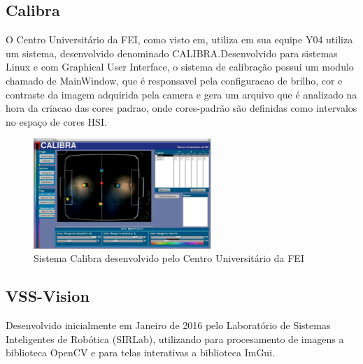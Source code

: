 \subsection{Calibra}
O Centro Universitário da FEI, como visto em\cite{PenharbelTime}, utiliza em sua equipe Y04 utiliza um sistema, desenvolvido denominado CALIBRA\cite{Penharbel:2004}.Desenvolvido para sistemas Linux e com Graphical User Interface\cite{Penharbel:2004}, o sistema de calibração possui um modulo chamado de MainWindow, que é responsavel pela configuracao de brilho, cor e contraste da imagem adquirida pela camera e gera um arquivo que é analizado na hora da criacao das cores padrao\cite{PenharbelTime}, onde cores-padrão são definidas como intervalos no espaço de cores HSI\cite{PenharbelTime}.

\begin{figure}[!h]
	\centering
	\includegraphics[width=0.6\textwidth]{calibra.pdf}
	\caption{Sistema Calibra desenvolvido pelo Centro Universitário da FEI \cite{Penharbel:2004}}
	\label{Calibra}
\end{figure}

\subsection{VSS-Vision}
Desenvolvido inicialmente em Janeiro de 2016 pelo Laboratório de Sistemas Inteligentes de Robótica (SIRLab), utilizando para procesamento de imagens a biblioteca OpenCV e para telas interativas a biblioteca  ImGui.

